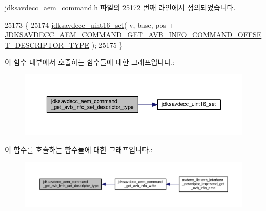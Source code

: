jdksavdecc\+\_\+aem\+\_\+command.\+h 파일의 25172 번째 라인에서 정의되었습니다.


\begin{DoxyCode}
25173 \{
25174     \hyperlink{group__endian_ga14b9eeadc05f94334096c127c955a60b}{jdksavdecc\_uint16\_set}( v, base, pos + 
      \hyperlink{group__command__get__avb__info_ga7f64d0540cbbe90207ef25e815343cd8}{JDKSAVDECC\_AEM\_COMMAND\_GET\_AVB\_INFO\_COMMAND\_OFFSET\_DESCRIPTOR\_TYPE}
       );
25175 \}
\end{DoxyCode}


이 함수 내부에서 호출하는 함수들에 대한 그래프입니다.\+:
\nopagebreak
\begin{figure}[H]
\begin{center}
\leavevmode
\includegraphics[width=350pt]{group__command__get__avb__info_ga858dc0a7b8713f92f32d8808b9944f32_cgraph}
\end{center}
\end{figure}




이 함수를 호출하는 함수들에 대한 그래프입니다.\+:
\nopagebreak
\begin{figure}[H]
\begin{center}
\leavevmode
\includegraphics[width=350pt]{group__command__get__avb__info_ga858dc0a7b8713f92f32d8808b9944f32_icgraph}
\end{center}
\end{figure}


